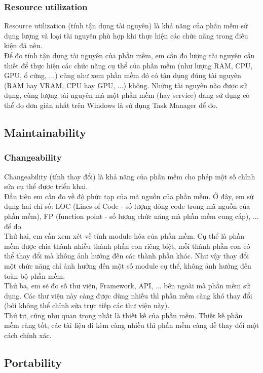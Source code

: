 \documentclass[14pt]{extarticle}
\begin{document}
\subsubsection{Resource utilization}
Resource utilization (tính tận dụng tài nguyên) là khả năng của phần mềm
sử dụng lượng và loại tài nguyên phù hợp khi thực hiện các chức năng trong
điều kiện đã nêu.\\
Để đo tính tận dụng tài nguyên của phần mềm, em cần đo lượng tài nguyên
cần thiết để thực hiện các chức năng cụ thể của phần mềm (như lượng RAM,
CPU, GPU, ổ cứng, ...) cũng như xem phần mềm đó có tận dụng đúng tài nguyên
(RAM hay VRAM, CPU hay GPU, ...) không. Những tài nguyên nào được sử dụng,
cùng lượng tài nguyên mà một phần mềm (hay service) đang sử dụng có thể đo
đơn giản nhất trên Windows là sử dụng Task Manager để đo.


\subsection{Maintainability}
\setcounter{subsubsection}{1}
\subsubsection{Changeability}
Changeability (tính thay đổi) là khả năng của phần mềm cho phép một số
chỉnh sửa cụ thể được triển khai.\\
Đầu tiên em cần đo về độ phức tạp của mã nguồn của phần mềm. Ở đây, em sử
dụng hai chỉ số: LOC (Lines of Code - số lượng dòng code trong mã nguồn của phần mềm), 
FP (function point - số lượng chức năng mà phần mềm cung cấp), ... để đo.\\
Thứ hai, em cần xem xét về tính module hóa của phần mềm. 
Cụ thể là phần mềm được chia thành nhiều thành phần con riêng biệt, mỗi thành phần
con có thể thay đổi mà không ảnh hưởng đến các thành phần khác. Như vậy
thay đổi một chức năng chỉ ảnh hưởng đến một số module cụ thể, không ảnh hưởng
đến toàn bộ phần mềm.\\
Thứ ba, em sẽ đo số thư viện, Framework, API, ... bên ngoài mà phần mềm sử dụng.
Các thư viện này càng được dùng nhiều thì phần mềm càng khó thay đổi (bởi
không thể chỉnh sửa trực tiếp các thư viện này).\\
Thứ tư, cũng như quan trọng nhất là thiết kế của phần mềm. Thiết kế phần mềm
càng tốt, các tài liệu đi kèm càng nhiều thì phần mềm càng dễ thay đổi một 
cách chính xác.

\subsection{Portability}
\setcounter{subsubsection}{1}
\end{document}
